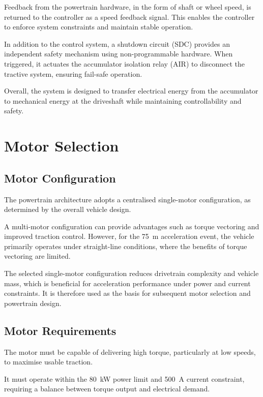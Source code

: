 \documentclass[11pt, a4paper]{report}
\numberwithin{equation}{section}
\begin{document}
Feedback from the powertrain hardware, in the form of shaft or wheel speed, is returned to the controller as a speed feedback signal. This enables the controller to enforce system constraints and maintain stable operation.

In addition to the control system, a shutdown circuit (SDC) provides an independent safety mechanism using non-programmable hardware. When triggered, it actuates the accumulator isolation relay (AIR) to disconnect the tractive system, ensuring fail-safe operation.

Overall, the system is designed to transfer electrical energy from the accumulator to mechanical energy at the driveshaft while maintaining controllability and safety.


\section{Motor Selection}

\subsection{Motor Configuration}

The powertrain architecture adopts a centralised single-motor configuration, as determined by the overall vehicle design.

A multi-motor configuration can provide advantages such as torque vectoring and improved traction control. However, for the \SI{75}{\meter} acceleration event, the vehicle primarily operates under straight-line conditions, where the benefits of torque vectoring are limited.

The selected single-motor configuration reduces drivetrain complexity and vehicle mass, which is beneficial for acceleration performance under power and current constraints. It is therefore used as the basis for subsequent motor selection and powertrain design.

\subsection{Motor Requirements}

The motor must be capable of delivering high torque, particularly at low speeds, to maximise usable traction.

It must operate within the \SI{80}{\kilo\watt} power limit and \SI{500}{\ampere} current constraint, requiring a balance between torque output and electrical demand.
\end{document}
